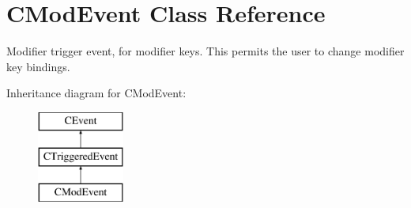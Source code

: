 \hypertarget{classCModEvent}{\section{C\-Mod\-Event Class Reference}
\label{classCModEvent}
}


Modifier trigger event, for modifier keys. This permits the user to change modifier key bindings.  


Inheritance diagram for C\-Mod\-Event\-:\begin{figure}[H]
\begin{center}
\leavevmode
\includegraphics[height=3.000000cm]{classCModEvent}
\end{center}
\end{figure}
